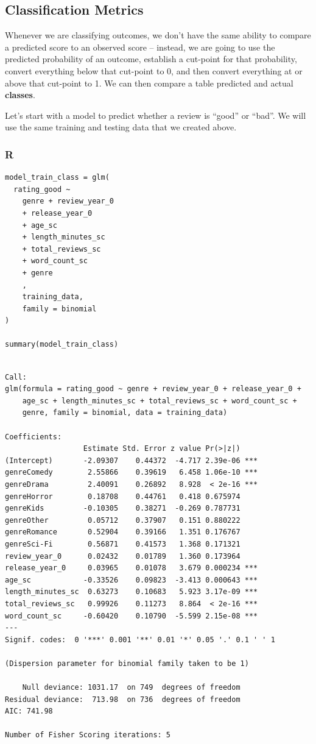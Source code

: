 \documentclass[
  letterpaper,
]{krantz}
\begin{document}
\subsection{Classification Metrics}\label{sec-knowing-class-metrics}

Whenever we are classifying outcomes, we don't have the same ability to
compare a predicted score to an observed score -- instead, we are going
to use the predicted probability of an outcome, establish a cut-point
for that probability, convert everything below that cut-point to 0, and
then convert everything at or above that cut-point to 1. We can then
compare a table predicted and actual \textbf{classes}.

Let's start with a model to predict whether a review is ``good'' or
``bad''. We will use the same training and testing data that we created
above.

\subsubsection{R}

\begin{verbatim}
model_train_class = glm(
  rating_good ~ 
    genre + review_year_0 
    + release_year_0 
    + age_sc 
    + length_minutes_sc 
    + total_reviews_sc 
    + word_count_sc 
    + genre     
    , 
    training_data, 
    family = binomial
)

summary(model_train_class)
\end{verbatim}

\begin{verbatim}

Call:
glm(formula = rating_good ~ genre + review_year_0 + release_year_0 + 
    age_sc + length_minutes_sc + total_reviews_sc + word_count_sc + 
    genre, family = binomial, data = training_data)

Coefficients:
                  Estimate Std. Error z value Pr(>|z|)    
(Intercept)       -2.09307    0.44372  -4.717 2.39e-06 ***
genreComedy        2.55866    0.39619   6.458 1.06e-10 ***
genreDrama         2.40091    0.26892   8.928  < 2e-16 ***
genreHorror        0.18708    0.44761   0.418 0.675974    
genreKids         -0.10305    0.38271  -0.269 0.787731    
genreOther         0.05712    0.37907   0.151 0.880222    
genreRomance       0.52904    0.39166   1.351 0.176767    
genreSci-Fi        0.56871    0.41573   1.368 0.171321    
review_year_0      0.02432    0.01789   1.360 0.173964    
release_year_0     0.03965    0.01078   3.679 0.000234 ***
age_sc            -0.33526    0.09823  -3.413 0.000643 ***
length_minutes_sc  0.63273    0.10683   5.923 3.17e-09 ***
total_reviews_sc   0.99926    0.11273   8.864  < 2e-16 ***
word_count_sc     -0.60420    0.10790  -5.599 2.15e-08 ***
---
Signif. codes:  0 '***' 0.001 '**' 0.01 '*' 0.05 '.' 0.1 ' ' 1

(Dispersion parameter for binomial family taken to be 1)

    Null deviance: 1031.17  on 749  degrees of freedom
Residual deviance:  713.98  on 736  degrees of freedom
AIC: 741.98

Number of Fisher Scoring iterations: 5
\end{verbatim}
\end{document}
